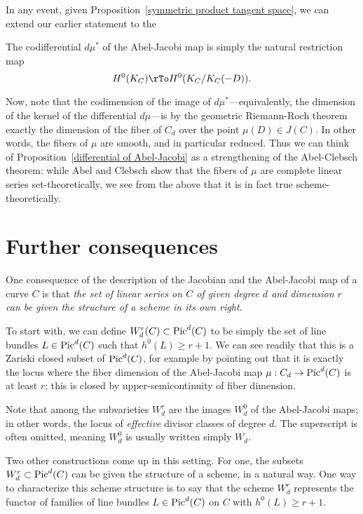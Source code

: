 In any event, given Proposition~\ref{symmetric product tangent space}, we can extend our earlier statement to the

\begin{proposition}\label{differential of Abel-Jacobi}
The codifferential $d\mu^*$ of the Abel-Jacobi map is simply the natural restriction map
$$
H^0(K_C) \rTo H^0(K_C/K_C(-D)).
$$
\end{proposition}

Now, note that the codimension of the image of $d\mu^*$---equivalently, the dimension of the kernel of the differential $d\mu$---is by the geometric Riemann-Roch theorem exactly the dimension of the fiber of $C_d$ over the point $\mu(D) \in J(C)$. In other words, the fibers of $\mu$ are smooth, and in particular reduced. Thus we can think of Proposition~\ref{differential of Abel-Jacobi} as a strengthening of the Abel-Clebsch theorem: while Abel and Clebsch show that the fibers of $\mu$ are complete linear series set-theoretically, we see from the above that it is in fact true scheme-theoretically.

\section{Further consequences}

One consequence of the description of the Jacobian and the Abel-Jacobi map of a curve $C$ is that \emph{the set of linear series on $C$ of given degree $d$ and dimension $r$ can be given the structure of a scheme in its own right}.

To start with, we can define $W^r_d(C) \subset \Pic^d(C)$ to be simply the set of line bundles $L \in \Pic^d(C)$ such that $h^0(L) \geq r+1$. We can see readily that this is a Zariski closed subset of $\Pic^d(C)$, for example by pointing out that it is exactly the locus where the fiber dimension of the Abel-Jacobi map $\mu : C_d \to \Pic^d(C)$ is at least $r$; this is closed by upper-semicontinuity of fiber dimension. 

Note that among the subvarieties $W^r_d$ are the images $W^0_d$ of the Abel-Jacobi maps; in other words, the locus of \emph{effective} divisor classes of degree $d$. The superscript is often omitted, meaning $W^0_d$ is usually written simply $W_d$.

Two other constructions come up in this setting. For one, the subsets $W^r_d \subset \Pic^d(C)$ can be given the structure of a scheme, in a natural way. One way to characterize this scheme structure is to say that the scheme $W^r_d$ represents the functor of families of line bundles $L \in \Pic^d(C)$ on $C$ with  $h^0(L) \geq r+1$.

